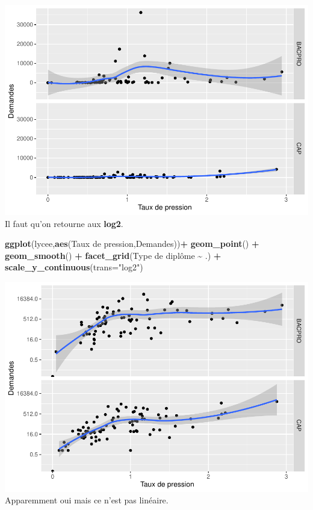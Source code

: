 \documentclass[
]{book}
\newenvironment{Shaded}{\begin{snugshade}}{\end{snugshade}}
\newcommand{\AttributeTok}[1]{\textcolor[rgb]{0.13,0.29,0.53}{#1}}
\newcommand{\FunctionTok}[1]{\textcolor[rgb]{0.13,0.29,0.53}{\textbf{#1}}}
\newcommand{\NormalTok}[1]{#1}
\newcommand{\SpecialCharTok}[1]{\textcolor[rgb]{0.81,0.36,0.00}{\textbf{#1}}}
\newcommand{\StringTok}[1]{\textcolor[rgb]{0.31,0.60,0.02}{#1}}
\begin{document}
\includegraphics{_main_files/figure-latex/lycee7-1.pdf}
Il faut qu'on retourne aux \textbf{log2}.

\begin{Shaded}
\begin{Highlighting}[]
\FunctionTok{ggplot}\NormalTok{(lycee,}\FunctionTok{aes}\NormalTok{(}\StringTok{\textasciigrave{}}\AttributeTok{Taux de pression}\StringTok{\textasciigrave{}}\NormalTok{,}\StringTok{\textasciigrave{}}\AttributeTok{Demandes}\StringTok{\textasciigrave{}}\NormalTok{))}\SpecialCharTok{+}
  \FunctionTok{geom\_point}\NormalTok{() }\SpecialCharTok{+} \FunctionTok{geom\_smooth}\NormalTok{()  }\SpecialCharTok{+} \FunctionTok{facet\_grid}\NormalTok{(}\StringTok{\textasciigrave{}}\AttributeTok{Type de diplôme}\StringTok{\textasciigrave{}} \SpecialCharTok{\textasciitilde{}}\NormalTok{ .) }\SpecialCharTok{+}
  \FunctionTok{scale\_y\_continuous}\NormalTok{(}\AttributeTok{trans=}\StringTok{"log2"}\NormalTok{)}
\end{Highlighting}
\end{Shaded}

\includegraphics{_main_files/figure-latex/lycee8-1.pdf}
Apparemment oui mais ce n'est pas linéaire.
\end{document}
